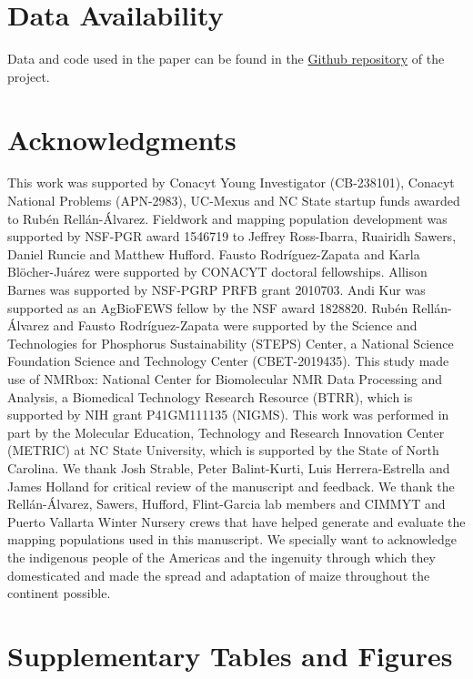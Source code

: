 \documentclass[9pt,twocolumn,twoside,lineno]{biorxiv}
\newcommand{\beginsupplement}{%
        \setcounter{table}{0}
        \renewcommand{\thetable}{S\arabic{table}}%
        \setcounter{figure}{0}
        \renewcommand{\thefigure}{S\arabic{figure}}%
     }
\begin{document}
\section{Data Availability}
Data and code used in the paper can be found in the \href{https://github.com/sawers-rellan-labs/High-PC1-paper}{Github repository} of the project. 

\section{Acknowledgments}
This work was supported by Conacyt Young Investigator (CB-238101), Conacyt National Problems (APN-2983), UC-Mexus and NC State startup funds awarded to Rub\'en Rellán-Álvarez. 
Fieldwork and mapping population development was supported by NSF-PGR award 1546719 to Jeffrey Ross-Ibarra, Ruairidh Sawers, Daniel Runcie and Matthew Hufford.  
Fausto Rodríguez-Zapata and Karla Blöcher-Juárez were supported by CONACYT doctoral fellowships.
Allison Barnes was supported by NSF-PGRP PRFB grant 2010703. 
Andi Kur was supported as an AgBioFEWS fellow by the NSF award 1828820.
Rubén Rellán-Álvarez and Fausto Rodríguez-Zapata were supported by the Science and Technologies for Phosphorus Sustainability (STEPS) Center, a National Science Foundation Science and Technology Center (CBET-2019435).
This study made use of NMRbox: National Center for Biomolecular NMR Data Processing and Analysis, a Biomedical Technology Research Resource (BTRR), which is supported by NIH grant P41GM111135 (NIGMS).
This work was performed in part by the Molecular Education, Technology and Research Innovation Center (METRIC) at NC State University, which is supported by the State of North Carolina.
We thank Josh Strable, Peter Balint-Kurti, Luis Herrera-Estrella and James Holland for critical review of the manuscript and feedback. 
We thank the Rellán-Álvarez, Sawers, Hufford, Flint-Garcia lab members and CIMMYT and Puerto Vallarta Winter Nursery crews that have helped generate and evaluate the mapping populations used in this manuscript.
We specially want to acknowledge the indigenous people of the Americas and the  ingenuity through which they domesticated and made the spread and adaptation of maize throughout the continent possible. 
\label{sec:acknowledgments}

\typeout{}


\clearpage
\beginsupplement

\onecolumn

\section*{Supplementary Tables and Figures}
\end{document}
